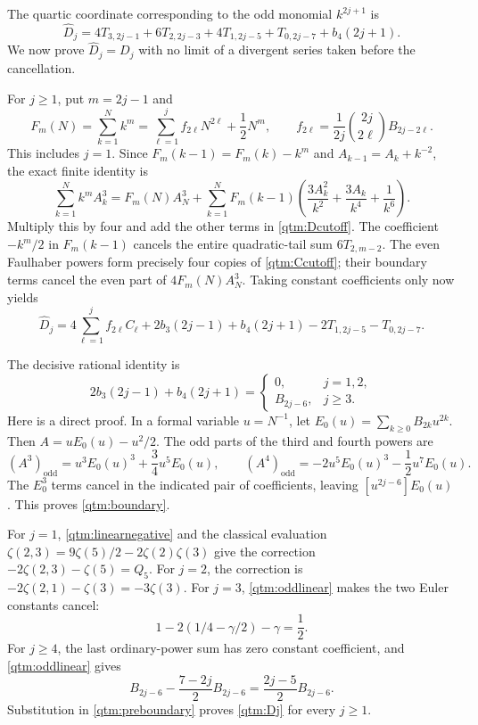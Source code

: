 The quartic coordinate corresponding to the odd monomial $k^{2j+1}$ is
\begin{equation}\label{qtm:Dcutoff}
 \widehat D_j=4T_{3,2j-1}+6T_{2,2j-3}
              +4T_{1,2j-5}+T_{0,2j-7}+b_4(2j+1).
\end{equation}
We now prove $\widehat D_j=D_j$ with no limit of a divergent
series taken before the cancellation.

For $j\ge1$, put $m=2j-1$ and
\begin{equation}\label{qtm:Faulhaber}
 F_m(N)=\sum_{k=1}^Nk^m
   =\sum_{\ell=1}^j f_{2\ell}N^{2\ell}+\frac12N^m,
 \qquad
 f_{2\ell}=\frac1{2j}\binom{2j}{2\ell}B_{2j-2\ell}.
\end{equation}
This includes $j=1$.  Since $F_m(k-1)=F_m(k)-k^m$ and
$A_{k-1}=A_k+k^{-2}$, the exact finite identity is
\begin{equation}\label{qtm:cubicSBP}
 \sum_{k=1}^Nk^m A_k^3
 =F_m(N)A_N^3+
 \sum_{k=1}^NF_m(k-1)
       \left(\frac{3A_k^2}{k^2}+\frac{3A_k}{k^4}+\frac1{k^6}\right).
\end{equation}
Multiply this by four and add the other terms in
\eqref{qtm:Dcutoff}.  The coefficient $-k^m/2$ in $F_m(k-1)$
cancels the entire quadratic-tail sum $6T_{2,m-2}$.  The even
Faulhaber powers form precisely four copies of
\eqref{qtm:Ccutoff}; their boundary terms cancel the even part of
$4F_m(N)A_N^3$.  Taking constant coefficients only now yields
\begin{equation}\label{qtm:preboundary}
 \widehat D_j=
 4\sum_{\ell=1}^j f_{2\ell}C_\ell
 +2b_3(2j-1)+b_4(2j+1)
 -2T_{1,2j-5}-T_{0,2j-7}.
\end{equation}

The decisive rational identity is
\begin{equation}\label{qtm:boundary}
 2b_3(2j-1)+b_4(2j+1)=
 \begin{cases}0,&j=1,2,\\B_{2j-6},&j\ge3.\end{cases}
\end{equation}
Here is a direct proof.  In a formal variable $u=N^{-1}$, let
$E_0(u)=\sum_{k\ge0}B_{2k}u^{2k}$.  Then
$A=uE_0(u)-u^2/2$.  The odd parts of the third and fourth powers are
\[
 (A^3)_{\mathrm{odd}}=u^3E_0(u)^3+\frac34u^5E_0(u),\qquad
 (A^4)_{\mathrm{odd}}=-2u^5E_0(u)^3-\frac12u^7E_0(u).
\]
The $E_0^3$ terms cancel in the indicated pair of coefficients,
leaving $[u^{2j-6}]E_0(u)$.  This proves \eqref{qtm:boundary}.

For $j=1$, \eqref{qtm:linearnegative} and the classical evaluation
$\zeta(2,3)=9\zeta(5)/2-2\zeta(2)\zeta(3)$ give the correction
$-2\zeta(2,3)-\zeta(5)=Q_5$.  For $j=2$, the correction is
$-2\zeta(2,1)-\zeta(3)=-3\zeta(3)$.  For $j=3$,
\eqref{qtm:oddlinear} makes the two Euler constants cancel:
\[
 1-2(1/4-\gamma/2)-\gamma=\frac12.
\]
For $j\ge4$, the last ordinary-power sum has zero constant
coefficient, and \eqref{qtm:oddlinear} gives
\[
 B_{2j-6}-\frac{7-2j}{2}B_{2j-6}
       =\frac{2j-5}{2}B_{2j-6}.
\]
Substitution in \eqref{qtm:preboundary} proves
\eqref{qtm:Dj} for every $j\ge1$.

